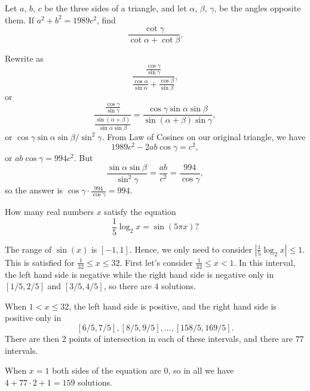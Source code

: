 \documentclass[11pt]{article}
\theoremstyle{definition}
\begin{document}
\begin{question}[name={1989 AIME, \href{https://artofproblemsolving.com/community/c4p436567}{Problem 10}}]
	Let $a$, $b$, $c$ be the three sides of a triangle, and let $\alpha$, $\beta$, $\gamma$, be the angles opposite them. If $a^2+b^2=1989c^2$, find\[ \frac{\cot \gamma}{\cot \alpha+\cot \beta}. \]
\end{question}


\begin{solution}[name={Solution by OlympusHero}]
	Rewrite as $$\displaystyle\frac{\displaystyle\frac{\cos \gamma}{\sin \gamma}}{\displaystyle\frac{\cos \alpha}{\sin \alpha}+\frac{\cos \beta}{\sin \beta}},$$ or $$\displaystyle\frac{\displaystyle\frac{\cos \gamma}{\sin \gamma}}{\displaystyle\frac{\sin(\alpha + \beta)}{\sin \alpha \sin \beta}}=\frac{\cos \gamma \sin \alpha \sin \beta}{\sin(\alpha + \beta)\sin \gamma},$$ or ${\cos \gamma \sin \alpha \sin \beta}/{\sin^2 \gamma}$. From Law of Cosines on our original triangle, we have $$1989c^2-2ab \cos \gamma = c^2,$$ or $ab \cos \gamma = 994c^2$. But $$\frac{\sin \alpha \sin \beta}{\sin^2 \gamma}=\frac{ab}{c^2} = \frac{994}{\cos \gamma},$$ so the answer is $\cos \gamma \cdot \frac{994}{\cos \gamma}=\boxed{994}$.
\end{solution}










\begin{question}[name={1991 AIME, \href{https://artofproblemsolving.com/community/c4p409912}{Problem 4}}]
	How many real numbers $x$ satisfy the equation $$\frac{1}{5}\log_2 x = \sin (5\pi x)?$$	
	
\end{question}


\begin{solution}[name={Solution by chess64}]
	The range of $\sin (x)$ is $[-1,1]$. Hence, we only need to consider $\left|\frac{1}{5}\log_2 x\right| \le 1$. This is satisfied for $\frac{1}{32} \le x \le 32$. First let's consider $\frac{1}{32} \le x < 1$. In this interval, the left hand side is negative while the right hand side is negative only in $[1/5,2/5]$ and $[3/5,4/5]$, so there are $4$ solutions.
	
	When $1< x \le 32$, the left hand side is positive, and the right hand side is positive only in $$[6/5,7/5], [8/5,9/5], \dots, [158/5,169/5].$$ There are then 2 points of intersection in each of these intervals, and there are $77$ intervals.
	
	When $x=1$ both sides of the equation are 0, so in all we have $4 + 77 \cdot 2 + 1 = \boxed{159}$ solutions.
\end{solution}
\end{document}
